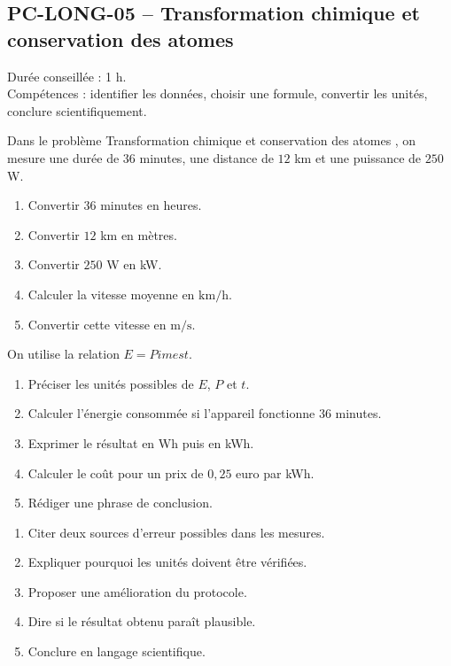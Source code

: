 \documentclass[11pt,a4paper]{article}
\newcounter{exercice}
\begin{document}
\subsection{PC-LONG-05 -- Transformation chimique et conservation des atomes}

\begin{objectif}
Durée conseillée : 1 h.\\
Compétences : identifier les données, choisir une formule, convertir les unités, conclure scientifiquement.
\end{objectif}
\begin{exercice}
Dans le problème \og Transformation chimique et conservation des atomes \fg, on mesure une durée de $36$ minutes, une distance de $12$ km et une puissance de $250$ W.
\begin{enumerate}
  \item Convertir $36$ minutes en heures.
  \item Convertir $12$ km en mètres.
  \item Convertir $250$ W en kW.
  \item Calculer la vitesse moyenne en $\mathrm{km/h}$.
  \item Convertir cette vitesse en $\mathrm{m/s}$.
\end{enumerate}
\end{exercice}

\begin{exercice}
On utilise la relation $E=P	imes t$.
\begin{enumerate}
  \item Préciser les unités possibles de $E$, $P$ et $t$.
  \item Calculer l'énergie consommée si l'appareil fonctionne $36$ minutes.
  \item Exprimer le résultat en Wh puis en kWh.
  \item Calculer le coût pour un prix de $0{,}25$ euro par kWh.
  \item Rédiger une phrase de conclusion.
\end{enumerate}
\end{exercice}

\begin{exercice}
\begin{enumerate}
  \item Citer deux sources d'erreur possibles dans les mesures.
  \item Expliquer pourquoi les unités doivent être vérifiées.
  \item Proposer une amélioration du protocole.
  \item Dire si le résultat obtenu paraît plausible.
  \item Conclure en langage scientifique.
\end{enumerate}
\end{exercice}
\newpage
\end{document}
